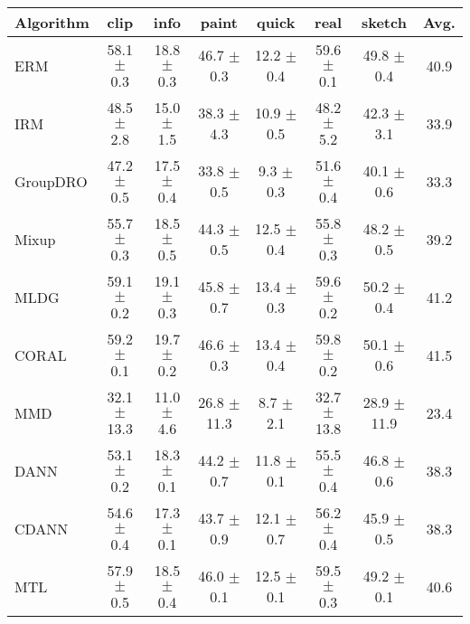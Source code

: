 \begin{table*}
\small
\begin{center}
\begin{tabular}{lccccccc}
\toprule
\textbf{Algorithm}   & \textbf{clip}        & \textbf{info}        & \textbf{paint}       & \textbf{quick}       & \textbf{real}        & \textbf{sketch}      & \textbf{Avg.}         \\
\midrule
ERM                  & 58.1 $\pm$ 0.3       & 18.8 $\pm$ 0.3       & 46.7 $\pm$ 0.3       & 12.2 $\pm$ 0.4       & 59.6 $\pm$ 0.1       & 49.8 $\pm$ 0.4       & 40.9                 \\
IRM                  & 48.5 $\pm$ 2.8       & 15.0 $\pm$ 1.5       & 38.3 $\pm$ 4.3       & 10.9 $\pm$ 0.5       & 48.2 $\pm$ 5.2       & 42.3 $\pm$ 3.1       & 33.9                 \\
GroupDRO             & 47.2 $\pm$ 0.5       & 17.5 $\pm$ 0.4       & 33.8 $\pm$ 0.5       & 9.3 $\pm$ 0.3        & 51.6 $\pm$ 0.4       & 40.1 $\pm$ 0.6       & 33.3                 \\
Mixup                & 55.7 $\pm$ 0.3       & 18.5 $\pm$ 0.5       & 44.3 $\pm$ 0.5       & 12.5 $\pm$ 0.4       & 55.8 $\pm$ 0.3       & 48.2 $\pm$ 0.5       & 39.2                 \\
MLDG                 & 59.1 $\pm$ 0.2       & 19.1 $\pm$ 0.3       & 45.8 $\pm$ 0.7       & 13.4 $\pm$ 0.3       & 59.6 $\pm$ 0.2       & 50.2 $\pm$ 0.4       & 41.2                 \\
CORAL                & 59.2 $\pm$ 0.1       & 19.7 $\pm$ 0.2       & 46.6 $\pm$ 0.3       & 13.4 $\pm$ 0.4       & 59.8 $\pm$ 0.2       & 50.1 $\pm$ 0.6       & 41.5                 \\
MMD                  & 32.1 $\pm$ 13.3      & 11.0 $\pm$ 4.6       & 26.8 $\pm$ 11.3      & 8.7 $\pm$ 2.1        & 32.7 $\pm$ 13.8      & 28.9 $\pm$ 11.9      & 23.4                 \\
DANN                 & 53.1 $\pm$ 0.2       & 18.3 $\pm$ 0.1       & 44.2 $\pm$ 0.7       & 11.8 $\pm$ 0.1       & 55.5 $\pm$ 0.4       & 46.8 $\pm$ 0.6       & 38.3                 \\
CDANN                & 54.6 $\pm$ 0.4       & 17.3 $\pm$ 0.1       & 43.7 $\pm$ 0.9       & 12.1 $\pm$ 0.7       & 56.2 $\pm$ 0.4       & 45.9 $\pm$ 0.5       & 38.3                 \\
MTL                  & 57.9 $\pm$ 0.5       & 18.5 $\pm$ 0.4       & 46.0 $\pm$ 0.1       & 12.5 $\pm$ 0.1       & 59.5 $\pm$ 0.3       & 49.2 $\pm$ 0.1       & 40.6                 \\

\end{tabular}
\end{center}
\end{table*}
